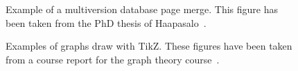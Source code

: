 \documentclass[12pt,a4paper,oneside,pdftex]{report}
\begin{document}


\begin{figure}[ht]
  \begin{center}
    
    \caption{Example of a multiversion database page merge. This figure has
    been taken from the PhD thesis of Haapasalo~\cite{HaapasaloThesis}.}
    \label{fig:page-merge}
  \end{center}
\end{figure}


\newlength{\graphdotsize}
\setlength{\graphdotsize}{1.7pt}
\newlength{\graphgridsize}
\setlength{\graphgridsize}{1.2em}
\begin{figure}[ht]
\begin{center}
\caption{Examples of graphs draw with TikZ. These figures have been taken from a
course report for the graph theory course~\cite{FerryProblem}.}
\label{fig:tikz-examples}
\end{center}
\end{figure}



% 

\end{document}
